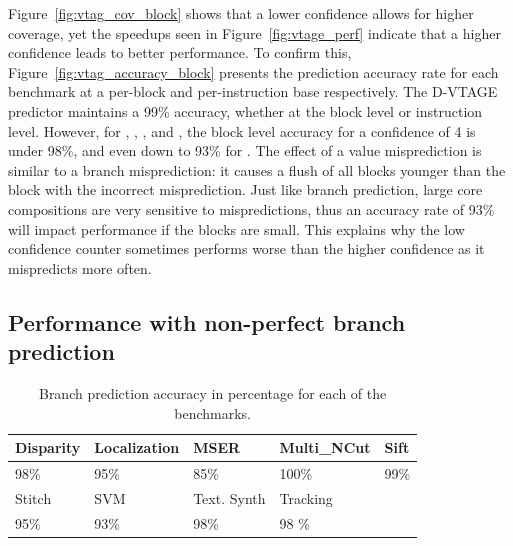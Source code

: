 Figure~\ref{fig:vtag_cov_block} shows that a lower confidence allows for higher coverage, yet the speedups seen in Figure~\ref{fig:vtage_perf} indicate that a higher confidence leads to better performance.
To confirm this, Figure~\ref{fig:vtag_accuracy_block} presents the prediction accuracy rate for each benchmark at a per-block and per-instruction base respectively.
The D-VTAGE predictor maintains a 99\% accuracy, whether at the block level or instruction level.
However, for , , ,  and , the block level accuracy for a confidence of 4 is under 98\%, and even down to 93\% for .
The effect of a value misprediction is similar to a branch misprediction: it causes a flush of all blocks younger than the block with the incorrect misprediction.
Just like branch prediction, large core compositions are very sensitive to mispredictions, thus an accuracy rate of 93\% will impact performance if the blocks are small.
This explains why the low confidence counter sometimes performs worse than the higher confidence as it mispredicts more often.

\subsection{Performance with non-perfect branch prediction}

\begin{table}[t]
  \small
  \centering
 \begin{tabular} { | l | l | l | l | l | }
 \hline
   \cellcolor[gray]{0.7}Disparity & \cellcolor[gray]{0.7} Localization& \cellcolor[gray]{0.7} MSER& \cellcolor[gray]{0.7} Multi\_NCut& \cellcolor[gray]{0.7} Sift\\ \hline
	98\%  & 95\% & 85\%  & 100\%& 99\%\\ \hline
	 \cellcolor[gray]{0.7} Stitch & \cellcolor[gray]{0.7} SVM & \cellcolor[gray]{0.7} Text. Synth & \cellcolor[gray]{0.7} Tracking&\\ \hline
	  95\%& 93\%& 98\%& 98 \%&\\ \hline
	\end{tabular}
  \caption{Branch prediction accuracy in percentage for each of the benchmarks.}\label{tab:sd-vbsbpred2}
\end{table}

